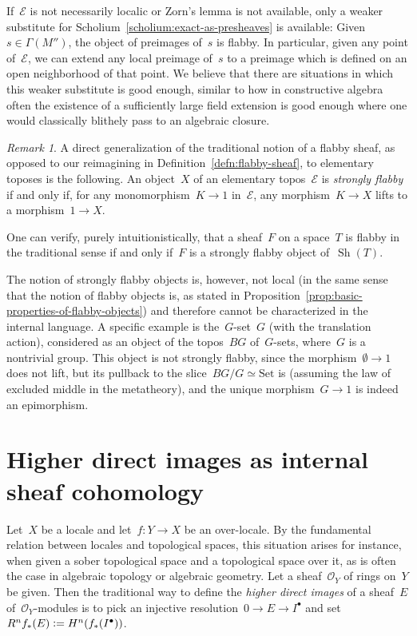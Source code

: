 \documentclass[oneside]{amsart}
\theoremstyle{definition}
\theoremstyle{plain}
\theoremstyle{remark}
\newtheorem{rem}[defn]{Remark}
\newcommand{\E}{\mathcal{E}}
\renewcommand{\O}{\mathcal{O}}
\newcommand{\defeq}{\vcentcolon=}
\DeclareMathOperator{\Sh}{Sh}
\newcommand{\Set}{\mathrm{Set}}
\renewcommand{\_}{\mathpunct{.}\,}
\begin{document}
If~$\E$ is not necessarily localic or Zorn's lemma is not available, only a
weaker substitute for Scholium~\ref{scholium:exact-as-presheaves} is available:
Given~$s \in \Gamma(M'')$, the object of preimages of~$s$ is flabby. In
particular, given any point of~$\E$, we can extend any local preimage of~$s$ to
a preimage which is defined on an open neighborhood of that point. We believe
that there are situations in which this weaker substitute is good enough,
similar to how in constructive algebra often the existence of a sufficiently
large field extension is good enough where one would classically blithely pass
to an algebraic closure.

\begin{rem}A direct generalization of the traditional notion of a flabby sheaf, as
opposed to our reimagining in Definition~\ref{defn:flabby-sheaf}, to
elementary toposes is the following. An object~$X$ of an elementary topos~$\E$
is \emph{strongly flabby} if and only if, for any monomorphism~$K \to 1$
in~$\E$, any morphism~$K \to X$ lifts to a morphism~$1 \to X$.

One can verify, purely intuitionistically, that a sheaf~$F$ on a space~$T$ is
flabby in the traditional sense if and only if~$F$ is a strongly flabby object
of~$\Sh(T)$.

The notion of strongly flabby objects is, however, not local (in the same sense
that the notion of flabby objects is, as stated in
Proposition~\ref{prop:basic-properties-of-flabby-objects})
and therefore cannot be characterized in the internal language. A specific
example is the~$G$-set~$G$ (with the translation action), considered as an
object of the topos~$BG$ of~$G$-sets, where~$G$ is a nontrivial group.
This object is not strongly flabby, since the morphism~$\emptyset \to 1$ does
not lift, but its pullback to the slice~$BG/G \simeq \Set$ is (assuming
the law of excluded middle in the metatheory), and the unique morphism~$G \to
1$ is indeed an epimorphism.
\end{rem}


\section{Higher direct images as internal sheaf cohomology}
\label{sect:higher-direct-images}

Let~$X$ be a locale and let~$f : Y \to X$ be an over-locale. By the fundamental
relation between locales and topological spaces, this situation arises
for instance, when given a sober topological space and a topological
space over it, as is often the case in algebraic topology or algebraic
geometry. Let a sheaf~$\O_Y$ of rings on~$Y$ be given. Then the
traditional way to define the \emph{higher direct images} of a sheaf~$E$
of~$\O_Y$-modules is to pick an injective resolution~$0 \to E \to I^\bullet$
and set~$R^n f_*(E) \defeq H^n(f_*(I^\bullet))$.
\end{document}
